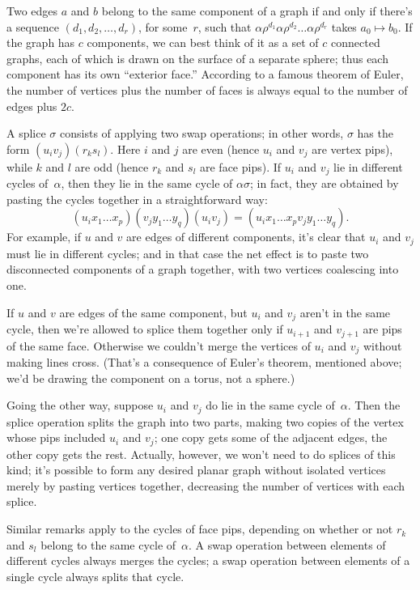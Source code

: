 Two edges $a$ and $b$ belong to the same component of a graph
if and only if there's a sequence $(d_1,d_2,\ldots,d_r)$, for some~$r$,
such that $\alpha\rho^{d_1}\alpha\rho^{d_2}\ldots\alpha\rho^{d_r}$
takes $a_0\mapsto b_0$. If the graph has $c$ components, we can best
think of it as a set of $c$ connected graphs, each of which is drawn on
the surface of a separate sphere; thus each component has its own
``exterior face.'' According to a famous theorem of Euler,
the number of vertices plus the number of faces
is always equal to the number of edges plus $2c$.

A splice $\sigma$ consists of applying two swap operations;
in other words, $\sigma$ has the form $(u_iv_j)(r_ks_l)$. Here $i$ and $j$ are
even (hence $u_i$ and $v_j$ are vertex pips), while $k$ and $l$ are odd (hence
$r_k$ and $s_l$ are face pips). If $u_i$ and $v_j$ lie in different
cycles of~$\alpha$, then they lie in the same cycle of $\alpha\sigma$; in fact,
they are obtained by pasting the cycles together in a straightforward way:
$$(u_ix_1\ldots x_p)(v_jy_1\ldots y_q)(u_iv_j)
=(u_ix_1\ldots x_pv_jy_1\ldots y_q).$$
For example, if $u$ and $v$ are edges of different components,
it's clear that $u_i$ and $v_j$ must lie in different cycles;
and in that case the net effect is to paste two disconnected components
of a graph together, with two vertices coalescing into one.

If $u$ and $v$ are edges of the same component, but $u_i$ and $v_j$ aren't
in the same cycle, then we're allowed to splice them together only if
$u_{i+1}$ and $v_{j+1}$ are pips of the same face. Otherwise
we couldn't merge the vertices of $u_i$ and $v_j$ without making lines
cross. (That's a consequence of Euler's theorem, mentioned above;
we'd be drawing the component on a torus, not a sphere.)

Going the other way, suppose $u_i$ and $v_j$ do lie
in the same cycle of~$\alpha$. Then
the splice operation splits the graph into two parts, making two
copies of the vertex whose pips included $u_i$ and $v_j$; one copy
gets some of the adjacent edges, the other copy gets the rest.
Actually, however, we won't need to do splices of this kind;
it's possible to form any desired planar graph without isolated vertices
merely by pasting
vertices together, decreasing the number of vertices with each splice.

Similar remarks apply to the cycles of face pips, depending on whether
or not $r_k$ and $s_l$ belong to the same cycle of~$\alpha$. A swap
operation between elements of different cycles always merges the
cycles; a swap operation between elements of a single cycle always
splits that cycle.

